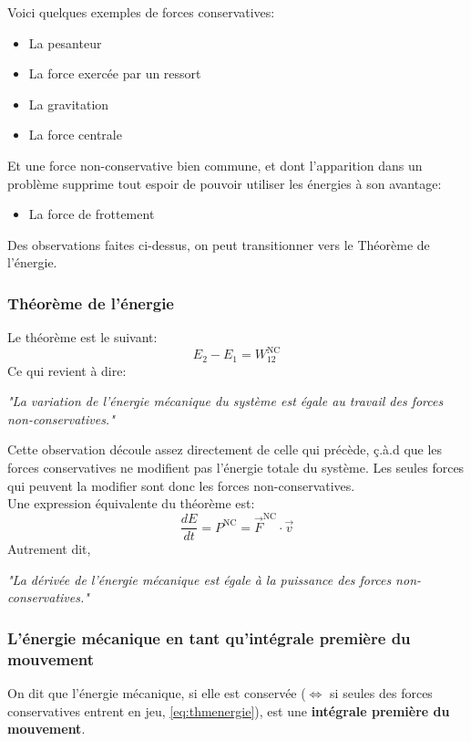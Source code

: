 \documentclass{article}
\numberwithin{equation}{section}
\begin{document}
Voici quelques exemples de forces conservatives:
\begin{itemize}
	\item La pesanteur
	\item La force exercée par un ressort
	\item La gravitation
	\item La force centrale %
\end{itemize}
Et une force non-conservative bien commune, et dont l'apparition dans un problème supprime tout espoir de pouvoir utiliser les énergies à son avantage:
\begin{itemize}
	\item La force de frottement
\end{itemize}

Des observations faites ci-dessus, on peut transitionner vers le Théorème de l'énergie.

\subsubsection{Théorème de l'énergie}
Le théorème est le suivant:
\begin{equation} \label{eq:thmenergie}
	\boxed{ E_2 - E_1 = W_{12}^\text{NC} }
\end{equation}
Ce qui revient à dire:
\begin{center}
	\emph{"La variation de l'énergie mécanique du système est égale au travail des forces non-conservatives."}
\end{center}
Cette observation découle assez directement de celle qui précède, ç.à.d que les forces conservatives ne modifient pas l'énergie totale du système. Les seules forces qui peuvent la modifier sont donc les forces non-conservatives. \\

Une expression équivalente du théorème est:
\begin{equation}
	\boxed{ \frac{dE}{dt} = P^\text{NC} = \vec F^\text{NC} \cdot \vec v }
\end{equation}
Autrement dit,
\begin{center}
	\emph{"La dérivée de l'énergie mécanique est égale à la puissance des forces non-conservatives."}
\end{center}

\subsubsection{L'énergie mécanique en tant qu'intégrale première du mouvement}
On dit que l'énergie mécanique, si elle est conservée (\(\Leftrightarrow\) si seules des forces conservatives entrent en jeu, \ref{eq:thmenergie}), est une \textbf{intégrale première du mouvement}. \\
\end{document}
